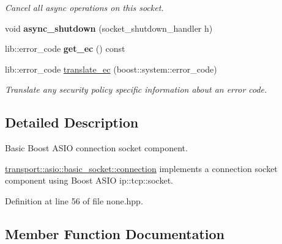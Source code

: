 \begin{DoxyCompactItemize}
\begin{DoxyCompactList}\small\item\em Cancel all async operations on this socket. \end{DoxyCompactList}\item 
void {\bfseries async\+\_\+shutdown} (socket\+\_\+shutdown\+\_\+handler h)\hypertarget{classwebsocketpp_1_1transport_1_1asio_1_1basic__socket_1_1connection_a4fee1e4fbf4a76361bffe5185f4fe2d1}{}\label{classwebsocketpp_1_1transport_1_1asio_1_1basic__socket_1_1connection_a4fee1e4fbf4a76361bffe5185f4fe2d1}

\item 
lib\+::error\+\_\+code {\bfseries get\+\_\+ec} () const\hypertarget{classwebsocketpp_1_1transport_1_1asio_1_1basic__socket_1_1connection_a959b352b412f30394a4e480bab01b7c7}{}\label{classwebsocketpp_1_1transport_1_1asio_1_1basic__socket_1_1connection_a959b352b412f30394a4e480bab01b7c7}

\item 
lib\+::error\+\_\+code \hyperlink{classwebsocketpp_1_1transport_1_1asio_1_1basic__socket_1_1connection_ad394f8369aa548830565adebfda02acb}{translate\+\_\+ec} (boost\+::system\+::error\+\_\+code)
\begin{DoxyCompactList}\small\item\em Translate any security policy specific information about an error code. \end{DoxyCompactList}\end{DoxyCompactItemize}


\subsection{Detailed Description}
Basic Boost A\+S\+IO connection socket component. 

\hyperlink{classwebsocketpp_1_1transport_1_1asio_1_1basic__socket_1_1connection}{transport\+::asio\+::basic\+\_\+socket\+::connection} implements a connection socket component using Boost A\+S\+IO ip\+::tcp\+::socket. 

Definition at line 56 of file none.\+hpp.



\subsection{Member Function Documentation}
